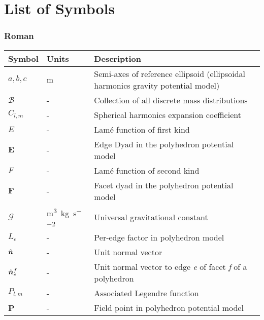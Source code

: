 \chapter*{List of Symbols}
\label{los}

\subsection*{Roman}
\begin{longtable}[l]{p{100pt} p{70pt} p{250pt}}
    \textbf{Symbol} & \textbf{Units} & \textbf{Description}                                 \\
    \hline
    $a, b, c$        & m                & Semi-axes of reference ellipsoid
                                          (ellipsoidal harmonics gravity potential model)   \\
    $\mathcal{B}$    & -                & Collection of all discrete mass distributions     \\
    $C_{l,m}$              & -                & Spherical harmonics expansion coefficient         \\
    $E$              & -                & Lam\'e function of first kind                     \\
    $\bm{E}$         & -                & Edge Dyad in the polyhedron potential model       \\
    $F$              & -                & Lam\'e function of second kind                    \\
    $\bm{F}$         & -                & Facet dyad in the polyhedron potential model      \\
    $\mathcal{G}$    & \si{\metre\cubed\per\kilo\gram\per\second\squared} & Universal gravitational constant               \\
    $L_e$            & -                & Per-edge factor in polyhedron model               \\
    $\hat{\bm{n}}$      & -                & Unit normal vector                                \\
    $\hat{\bm{n}}_e^f$  & -                & Unit normal vector to edge \textit{e}
                                          of facet \textit{f} of a polyhedron               \\
    $P_{l,m}$              & -                & Associated Legendre function                \\
    \textbf{P}       & -                & Field point in polyhedron potential model         \\

\end{longtable}
